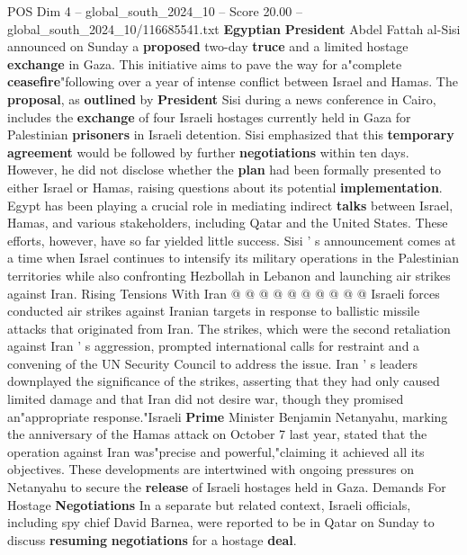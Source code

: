 \begin{textsample}{POS Dim 4 – global\_south\_2024\_10 – Score 20.00 – global\_south\_2024\_10/116685541.txt}  \label{ex:f4_pos_383}
\textbf{Egyptian} \textbf{President} Abdel Fattah al-Sisi announced on Sunday a \textbf{proposed} two-day \textbf{truce} and a limited hostage \textbf{exchange} in Gaza.
This initiative aims to pave the way for a"complete \textbf{ceasefire}"following over a year of intense conflict between Israel and Hamas.
The \textbf{proposal}, as \textbf{outlined} by \textbf{President} Sisi during a news conference in Cairo, includes the \textbf{exchange} of four Israeli hostages currently held in Gaza for Palestinian \textbf{prisoners} in Israeli detention.
Sisi emphasized that this \textbf{temporary} \textbf{agreement} would be followed by further \textbf{negotiations} within ten days.
However, he did not disclose whether the \textbf{plan} had been formally presented to either Israel or Hamas, raising questions about its potential \textbf{implementation}.
Egypt has been playing a crucial role in mediating indirect \textbf{talks} between Israel, Hamas, and various stakeholders, including Qatar and the United States.
These efforts, however, have so far yielded little success.
Sisi ' s announcement comes at a time when Israel continues to intensify its military operations in the Palestinian territories while also confronting Hezbollah in Lebanon and launching air strikes against Iran.
Rising Tensions With Iran @ @ @ @ @ @ @ @ @ @ Israeli forces conducted air strikes against Iranian targets in response to ballistic missile attacks that originated from Iran.
The strikes, which were the second retaliation against Iran ' s aggression, prompted international calls for restraint and a convening of the UN Security Council to address the issue.
Iran ' s leaders downplayed the significance of the strikes, asserting that they had only caused limited damage and that Iran did not desire war, though they promised an"appropriate response."Israeli \textbf{Prime} Minister Benjamin Netanyahu, marking the anniversary of the Hamas attack on October 7 last year, stated that the operation against Iran was"precise and powerful,"claiming it achieved all its objectives.
These developments are intertwined with ongoing pressures on Netanyahu to secure the \textbf{release} of Israeli hostages held in Gaza.
Demands For Hostage \textbf{Negotiations} In a separate but related context, Israeli officials, including spy chief David Barnea, were reported to be in Qatar on Sunday to discuss \textbf{resuming} \textbf{negotiations} for a hostage \textbf{deal}.

\end{textsample}

